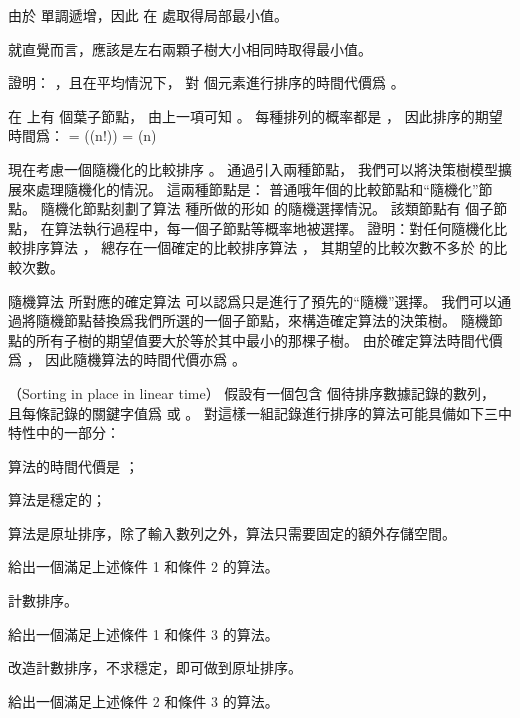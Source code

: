 由於  單調遞增，因此  在  處取得局部最小值。

就直覺而言，應該是左右兩顆子樹大小相同時取得最小值。
\stopANSWER

\startitem
證明： ，且在平均情況下，
對  個元素進行排序的時間代價爲 。
\stopitem

\startANSWER
在  上有  個葉子節點，
由上一項可知 。
每種排列的概率都是 ，
因此排序的期望時間爲：
\startformula
{} = \Omega(\lg(n!)) = \Omega(n)
\stopformula
\stopANSWER
\stopigBase

現在考慮一個隨機化的比較排序 。
通過引入兩種節點，
我們可以將決策樹模型擴展來處理隨機化的情況。
這兩種節點是：
普通哦年個的比較節點和“隨機化”節點。
隨機化節點刻劃了算法  種所做的形如  的隨機選擇情況。
該類節點有  個子節點，
在算法執行過程中，每一個子節點等概率地被選擇。
\startigBase[a,continue]
\startitem
證明：對任何隨機化比較排序算法 ，
總存在一個確定的比較排序算法 ，
其期望的比較次數不多於  的比較次數。
\stopitem

\startANSWER
隨機算法  所對應的確定算法  可以認爲只是進行了預先的“隨機”選擇。
我們可以通過將隨機節點替換爲我們所選的一個子節點，來構造確定算法的決策樹。
隨機節點的所有子樹的期望值要大於等於其中最小的那棵子樹。
由於確定算法時間代價爲 ，
因此隨機算法的時間代價亦爲 。
\stopANSWER
\stopigBase

\stopPROBLEM

\startPROBLEM
（Sorting in place in linear time）
假設有一個包含  個待排序數據記錄的數列，
且每條記錄的關鍵字值爲  或 。
對這樣一組記錄進行排序的算法可能具備如下三中特性中的一部分：
\startigBase[n]
\item 算法的時間代價是 ；
\item 算法是穩定的；
\item 算法是原址排序，除了輸入數列之外，算法只需要固定的額外存儲空間。
\stopigBase

\startigBase[a]
\startitem
給出一個滿足上述條件 1 和條件 2 的算法。
\stopitem

\startANSWER
計數排序。
\stopANSWER

\startitem
給出一個滿足上述條件 1 和條件 3 的算法。
\stopitem

\startANSWER
改造計數排序，不求穩定，即可做到原址排序。
\stopANSWER

\startitem
給出一個滿足上述條件 2 和條件 3 的算法。
\stopitem

